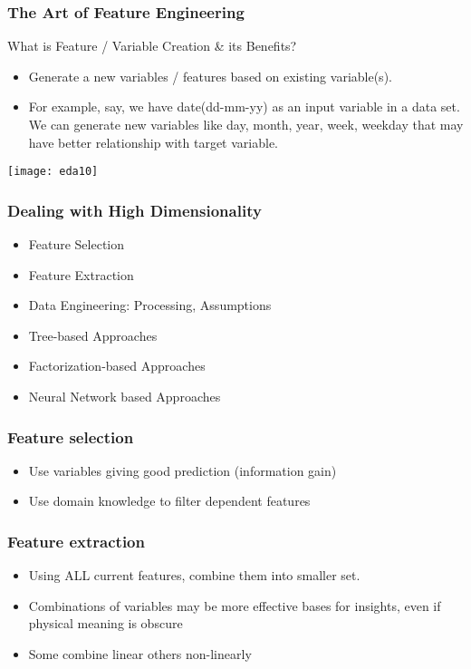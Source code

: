 \begin{frame}[fragile]\frametitle{The Art of Feature Engineering}
What is Feature / Variable Creation \& its Benefits? 
	\begin{itemize}
	\item Generate a new variables / features based on existing 
variable(s). 
\item For example, say, we have date(dd-mm-yy) as an input variable in a data set. We 
can  generate  new  variables  like  day,  month,  year,  week,  weekday  that  may  have  better 
relationship with target variable. 
	\end{itemize}

\begin{center}
\texttt{[image: eda10]}
\end{center}
\end{frame}


\begin{frame}[fragile]\frametitle{Dealing with High Dimensionality}
	\begin{itemize}
	\item Feature Selection
	\item Feature Extraction
	\item Data Engineering: Processing, Assumptions
	\item Tree-based Approaches
	\item Factorization-based Approaches
	\item Neural Network based Approaches
	\end{itemize}
\end{frame}

\begin{frame}[fragile]\frametitle{Feature selection}
	\begin{itemize}
	\item Use variables giving good prediction (information gain)
	\item Use domain knowledge to filter dependent features
	\end{itemize}
\end{frame}




\begin{frame}[fragile]\frametitle{Feature extraction}
	\begin{itemize}
	\item Using ALL current features, combine them into smaller set. 
	\item Combinations of variables may be more effective bases for insights, even if physical meaning is obscure
	\item Some combine linear others non-linearly
	\end{itemize}
\end{frame}

